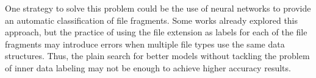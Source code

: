 One strategy to solve this problem could be the use of neural networks to provide an automatic classification of file fragments. Some works already explored this approach, but the practice of using the file extension as labels for each of the file fragments may introduce errors when multiple file types use the same data structures. Thus, the plain search for better models without tackling the problem of inner data labeling may not be enough to achieve higher accuracy results.